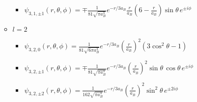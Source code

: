 \documentclass{article}
\begin{document}
\begin{itemize}
\begin{itemize}
\begin{itemize}
            \item[] $\psi_{3,1,\pm1}(r,\theta,\phi)=\mp\frac{1}{81\sqrt{\pi a_B^3}}e^{-r/3a_B}\frac{r}{a_B}\left(6-\frac{r}{a_B}\right)\sin\theta \,e^{\pm i \phi}$
        \end{itemize}
        \item $l=2$
        \begin{itemize}
            \item[] $\psi_{3,2,0}(r,\theta,\phi)=\frac{1}{81\sqrt{6\pi a_B^3}}e^{-r/3a_B}\left(\frac{r}{a_B}\right)^2\left(3\cos^2\theta-1\right)$
            \item[] $\psi_{3,2,\pm1}(r,\theta,\phi)=\mp \frac{1}{81\sqrt{\pi a_B^3}}e^{-r/3a_B}\left(\frac{r}{a_B}\right)^2 \sin\theta\, \cos\theta \,e^{\pm i \phi}$
            \item[] $\psi_{3,2,\pm2}(r,\theta,\phi)=\frac{1}{162\sqrt{\pi a_B^3}}e^{-r/3a_B}\left(\frac{r}{a_B}\right)^2\sin^2\theta\,e^{\pm2i\phi}$ 
        \end{itemize}
    \end{itemize}
\end{itemize}
\end{document}
